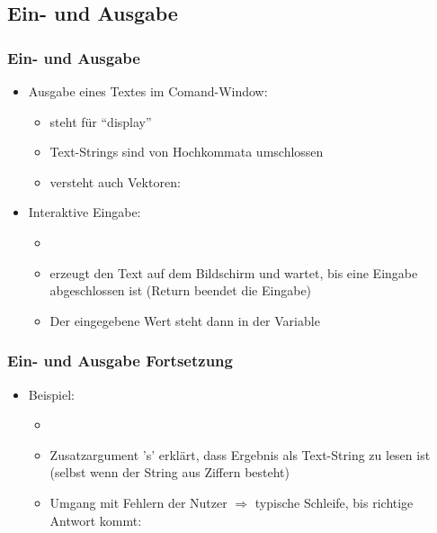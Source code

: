   \subsection{Ein- und Ausgabe}
  \begin{frame}
      \frametitle{Ein- und Ausgabe}
      \begin{itemize}
          \item Ausgabe eines Textes im Comand-Window:
            \begin{itemize}
                \item {} steht für ``display''
                \item Text-Strings sind von Hochkommata umschlossen
                \item {} versteht auch Vektoren: 
            \end{itemize}
          \item Interaktive Eingabe:
          \begin{itemize}
              \item {} 
              \item erzeugt den Text auf dem Bildschirm und wartet, bis eine Eingabe abgeschlossen ist (Return beendet die Eingabe)
              \item Der eingegebene Wert steht dann in der Variable 
          \end{itemize}
      \end{itemize}
  \end{frame}

  \begin{frame}
      \frametitle{Ein- und Ausgabe Fortsetzung}
      \begin{itemize}
          \item Beispiel:
          \begin{itemize}
              \item {}
              \item Zusatzargument 's' erklärt, dass Ergebnis als Text-String zu lesen ist (selbst wenn der String aus Ziffern besteht)
              \item Umgang mit Fehlern der Nutzer $\Rightarrow$ typische Schleife, bis richtige Antwort kommt:
          \end{itemize}
          
      \end{itemize}
  \end{frame}



